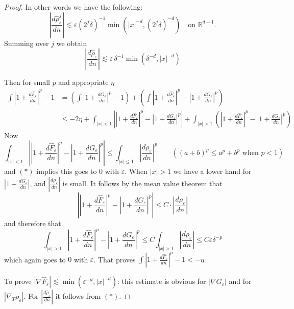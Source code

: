 \documentclass[11pt,reqno]{amsart}
\newcommand{\Rdm}{\mathbb{R}^{d-1}}
\newcommand{\dn}[1]{\frac{d#1}{dn}}
\newcommand{\he}[1]{\widehat{#1}}          %
\begin{document}
\begin{proof}
In other words we have the following:
\begin{equation*}
  \left|\dn{\he{\rho}_\varepsilon^{j}}\right|
   \lesssim\varepsilon\left(2^j\delta\right)^{-1}
     \min\!\left(|x|^{-d},\left(2^j\delta\right)^{-d}\right)\quad\text{on }\Rdm .
\end{equation*}
Summing over $j$ we obtain
\begin{equation}\tag{$*$}
  \left|\dn{\he{\rho}_\varepsilon}\right|
   \lesssim\varepsilon\,\delta^{-1}\min\!\left(\delta^{-d},|x|^{-d}\right)
\end{equation}

Then for small $p$ and appropriate $\eta$
\begin{align*}
 \int\left|1+\dn{\he{F}_\varepsilon}\right|^{p}-1
 &=\left(\int\left|1+\dn{G_\varepsilon}\right|^{p}-1\right)
  +\left(\int\left|1+\dn{\he{F}_\varepsilon}\right|^{p}
        -\left|1+\dn{G_\varepsilon}\right|^{p}\right)\\
 &\leq -2\eta+\int_{|x|<1}\left|\left|1+\dn{\he{F}_\varepsilon}\right|^{p}
        -\left|1+\dn{G_\varepsilon}\right|^{p}\right|
  +\int_{|x|>1}\left(\left|1+\dn{\he{F}_\varepsilon}\right|^{p}
        -\left|1+\dn{G_\varepsilon}\right|^{p}\right)
\end{align*}
Now
\begin{equation*}
 \int_{|x|<1}\left|\left|1+\dn{\he{F}_\varepsilon}\right|^{p}
   -\left|1+\dn{G_\varepsilon}\right|^{p}\right|
 \leq\int_{|x|\leq 1}\left|\dn{\rho_\varepsilon}\right|^{p}
 \qquad ((a+b)^p\leq a^p+b^p \text{ when } p<1)
\end{equation*}
and $(*)$ implies this goes to $0$ with $\varepsilon$.  When $|x|>1$ we have a
lower hand for $|1+\dn{G_\varepsilon}|$, and $|\dn{\rho_\varepsilon}|$ is small.
It follows by the mean value theorem that
\begin{equation*}
 \left|\left|1+\dn{\he{F}_\varepsilon}\right|^{p}
  -\left|1+\dn{G_\varepsilon}\right|^{p}\right|\leq C\cdot\left|\dn{\rho_\varepsilon}\right|
\end{equation*}
and therefore that
\begin{equation*}
 \int_{|x|>1}\left|1+\dn{\he{F}_\varepsilon}\right|^{p}
  -\left|1+\dn{G_\varepsilon}\right|^{p}
 \leq C\int_{|x|>1}\left|\dn{\rho_\varepsilon}\right|
 \leq C\varepsilon\delta^{-p}
\end{equation*}
which again goes to $0$ with $\varepsilon$.  That proves
$\int\left|1+\dn{\he{F}_\varepsilon}\right|^{p}-1<-\eta$.

To prove $|\nabla\he{F}_\varepsilon|\lesssim\min(\varepsilon^{-d},|x|^{-d})$: this
estimate is obvious for $|\nabla G_\varepsilon|$ and for $|\nabla_T\rho_\varepsilon|$.
For $|\dn{\he{\rho}_\varepsilon}|$ it follows from $(*)$.
\end{proof}
\end{document}
